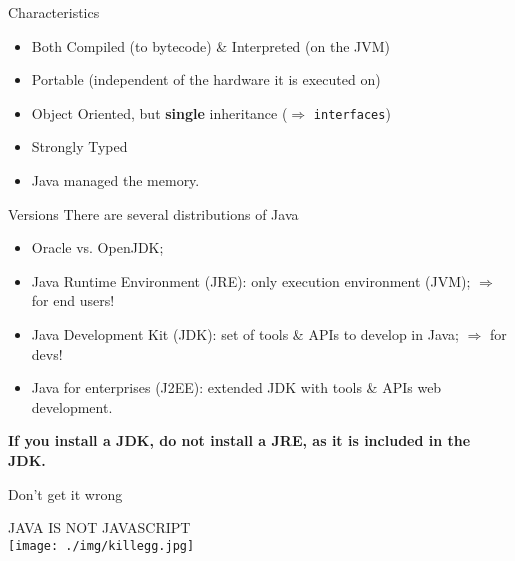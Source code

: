 \documentclass[English,c,%
hyperref={%
    pdftitle={FISA-DE2 OOP in Java},%
    pdfauthor={Muller, Gravier, Laforest, Subercaze},%
    pdfsubject={OOP in Java},%
    pdfkeywords={OOP, Java}%
    },%
xcolor={pdftex,svgnames} %
]{beamer}
\begin{document}
\begin{frame}{Characteristics}
\begin{itemize}
  \item Both Compiled (to bytecode) \& Interpreted (on the JVM)
  \vspace{1em}
  \item Portable (independent of the hardware it is executed on)
  \vspace{1em}
  \item Object Oriented, but \textbf{single} inheritance ($\Rightarrow$ \texttt{interfaces})
  \vspace{1em}
  \item Strongly Typed
  \vspace{1em}
  \item Java managed the memory.
\end{itemize}
\end{frame}

\begin{frame}{Versions}
There are several distributions of Java
\begin{itemize}
  \item Oracle vs. OpenJDK;
  \item Java Runtime Environment (JRE): only execution environment (JVM);
  $\Rightarrow$ for end users!
  \item Java Development Kit (JDK): set of tools \& APIs to develop in Java;
  $\Rightarrow$ for devs!
  \item Java for enterprises (J2EE): extended JDK with tools \& APIs web development.
\end{itemize}

\textbf{If you install a JDK, do not install a JRE, as it is included in the JDK.}
\end{frame}

\begin{frame}{Don't get it wrong}
\begin{center}
JAVA IS NOT JAVASCRIPT\\[1.5em]
\texttt{[image: ./img/killegg.jpg]}
\end{center}
\end{frame}
\end{document}
